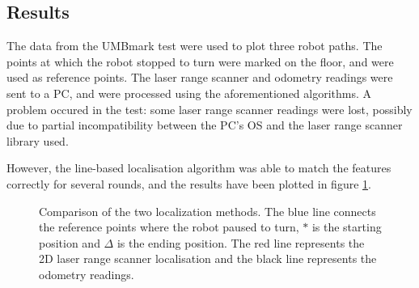 \subsection{Results}
The data from the UMBmark test were used to plot three robot paths.
The points at which the robot stopped to turn were marked on the floor,
and were used as reference points.
The laser range scanner and odometry readings were sent to a PC,
and were processed using the aforementioned algorithms.
A problem occured in the test: some laser range scanner readings were lost,
possibly due to partial incompatibility between the PC's OS and the laser range scanner library used.

However, the line-based localisation algorithm was able to match the features correctly for several
rounds, and the results have been plotted in figure \ref{fig:comparisonOfEncoderVSScanner}.

\begin{figure}[H]
\centering
{}
\caption[Comparison of the two localization methods.]{Comparison of the two localization methods.
The blue line connects the reference points where the robot paused to turn,
$*$ is the starting position and $\Delta$ is the ending position.
The red line represents the 2D laser range scanner localisation and the black line represents the odometry readings.}
\label{fig:comparisonOfEncoderVSScanner}
\end{figure}

